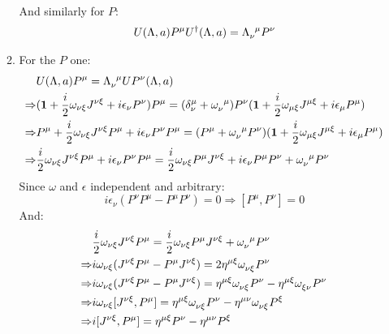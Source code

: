 \documentclass[12pt,a4]{article}
\begin{document}
\begin{enumerate}
\begin{enumerate}
\begin{align*}
    \end{align*}
    And similarly for $P$:
    \begin{align*}
      U(\Lambda, a) P^{\mu} U^{\dagger}(\Lambda, a) = \tensor{\Lambda}{_\nu^\mu} P^\nu
    \end{align*}
  \item
    For the $P$ one:
    \begin{align*}
      & U(\Lambda, a) P^{\mu} = \tensor{\Lambda}{_\nu^\mu}U P^\nu(\Lambda, a)\\
      \Rightarrow & (\mathbf{1} + \frac{i}{2} \omega_{\nu\xi} J^{\nu\xi} + i\epsilon_\nu P^\nu) P^\mu = (\delta^\mu_\nu + \tensor{\omega}{_\nu^\mu} )P^\nu (\mathbf{1} + \frac{i}{2} \omega_{\mu\xi} J^{\mu\xi} + i\epsilon_\mu P^\mu)\\
      \Rightarrow & P^\mu+ \frac{i}{2} \omega_{\nu\xi} J^{\nu\xi}P^\mu + i\epsilon_\nu P^\nu P^\mu  = (P^\mu + \tensor{\omega}{_\nu^\mu}P^\nu ) (\mathbf{1} + \frac{i}{2} \omega_{\mu\xi} J^{\mu\xi} + i\epsilon_\mu P^\mu)\\
      \Rightarrow & \frac{i}{2} \omega_{\nu\xi} J^{\nu\xi}P^\mu + i\epsilon_\nu P^\nu P^\mu  =  \frac{i}{2} \omega_{\nu\xi} P^\mu J^{\nu\xi} + i\epsilon_\nu P^\mu P^\nu  + \tensor{\omega}{_\nu^\mu}P^\nu\\
    \end{align*}
    Since $\omega$ and $\epsilon $ independent and arbitrary:
    \begin{equation*}
      i\epsilon_\nu (P^\nu P^\mu - P^\mu P^\nu) = 0 \Rightarrow [P^\mu, P^\nu] = 0
    \end{equation*}
    And:
    \begin{align*}
                  & \frac{i}{2} \omega_{\nu\xi} J^{\nu\xi}P^\mu =  \frac{i}{2} \omega_{\nu\xi} P^\mu J^{\nu\xi} + \tensor{\omega}{_\nu^\mu}P^\nu\\
      \Rightarrow & i \omega_{\nu\xi} (J^{\nu\xi}P^\mu - P^\mu J^{\nu\xi}) = 2\eta^{\mu\xi}\tensor{\omega}{_\nu_\xi}P^\nu\\
      \Rightarrow & i \omega_{\nu\xi} (J^{\nu\xi}P^\mu - P^\mu J^{\nu\xi}) = \eta^{\mu\xi}\tensor{\omega}{_\nu_\xi}P^\nu - \eta^{\mu\xi}\tensor{\omega}{_\xi_\nu}P^\nu\\
      \Rightarrow & i \omega_{\nu\xi} [J^{\nu\xi},P^\mu] = \eta^{\mu\xi}\tensor{\omega}{_\nu_\xi}P^\nu - \eta^{\mu\nu}\tensor{\omega}{_\nu_\xi}P^\xi\\
      \Rightarrow & i [J^{\nu\xi},P^\mu] = \eta^{\mu\xi}P^\nu - \eta^{\mu\nu}P^\xi\\

\end{align*}
\end{enumerate}
\end{enumerate}
\end{document}
